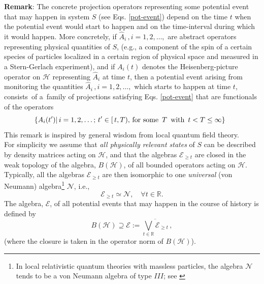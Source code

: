 \documentclass[12pt]{article}
\begin{document}
\begin{enumerate}
{{\bf{Remark}}: The concrete projection operators representing some potential event that may happen in system $S$ (see Eqs. \eqref{pot-event}) depend
on the time $t$ when the potential event would start to happen and on the time-interval during which it would happen. More concretely, if $\hat{A}_{i}\,, i=1,2, \dots,$ are abstract operators representing physical quantities of $S$, (e.g., a component of the spin of a certain species of particles localized in a certain region of physical space and measured in a Stern-Gerlach experiment), and if $A_{i}(t)$ denotes the Heisenberg-picture operator on $\mathcal{H}$ representing $\hat{A}_i$ at time $t$, then a potential event arising from monitoring the quantities 
$\hat{A}_i \,,i=1,2, \dots,$ which starts to happen at time $t$, consists \,of a \,family of projections
satisfying Eqs. \eqref{pot-event} that are functionals of the operators 
$$\hspace{0.5cm} \lbrace A_{i}(t') \vert\, i=1,2, \dots;\, t' \in [\,t, T),\,\text{for some }\,T\, \text{ with  }\, t<T \leq \infty \rbrace \hspace{0.7cm} \square$$
This remark is inspired by general wisdom from local quantum field theory.\\

For simplicity we assume that \textit{all physically relevant states} of $S$ can be described by density matrices acting on $\mathcal{H}$, and that the algebras $\mathcal{E}_{\geq t}$ are closed in the weak topology of the algebra, $B(\mathcal{H})$, of all bounded operators acting on $\mathcal{H}$. Typically, all the algebras $\mathcal{E}_{\geq t}$ are then isomorphic to one \textit{universal} (von Neumann) algebra\footnote{In local relativistic quantum theories with massless particles, the algebra $\mathcal{N}$ tends to be a von Neumann algebra of type $III$; see \cite{Buchholz}} $\mathcal{N}$, i.e., 
\begin{equation}\label{iso}
\mathcal{E}_{\geq t} \simeq \mathcal{N}, \quad \forall t \in \mathbb{R}.
\end{equation}
The algebra, $\mathcal{E}$, of all potential events that may happen in the course of history is defined by
\begin{equation}\label{allevents}
B(\mathcal{H}) \supseteq \mathcal{E}:= \overline{\bigvee_{t \in \mathbb{R}} \mathcal{E}_{\geq t}}\,,
\end{equation}
(where the closure is taken in the operator norm of $B(\mathcal{H})$).
}\\


\end{enumerate}
\end{document}
